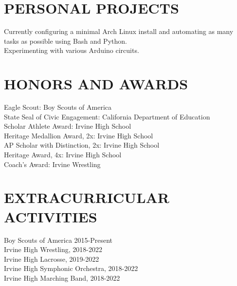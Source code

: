 \documentclass[25pt]{res}
\begin{document}
\begin{resume}
\section{PERSONAL PROJECTS}
    Currently configuring a minimal Arch Linux install and automating as many tasks as possible using Bash and Python.\\
    Experimenting with various Arduino circuits.
 
\section{HONORS AND AWARDS}          
    Eagle Scout: Boy Scouts of America \\
    State Seal of Civic Engagement: California Department of Education \\
    Scholar Athlete Award: Irvine High School \\
    Heritage Medallion Award, 2x: Irvine High School \\
    AP Scholar with Distinction, 2x: Irvine High School \\
    Heritage Award, 4x: Irvine High School \\
    Coach's Award: Irvine Wrestling

\section{EXTRACURRICULAR ACTIVITIES}          
    Boy Scouts of America 2015-Present\\
    Irvine High Wrestling, 2018-2022 \\
    Irvine High Lacrosse, 2019-2022 \\
    Irvine High Symphonic Orchestra, 2018-2022 \\
    Irvine High Marching Band, 2018-2022
\end{resume}
\end{document}
